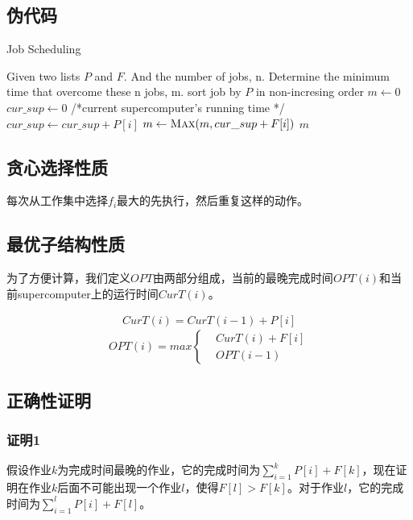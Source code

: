 \documentclass[UTF8,a4paper,12pt]{article}
\begin{document}
\begin{CJK}{UTF8}{gkai}
	\subsection{伪代码}
		\begin{algorithm}[htb]
			\caption{Job Scheduling}
			\begin{algorithmic}[1]
				\Require
					Given two lists $ P $ and $ F $. And the number of jobs, n.
				\Ensure
					Determine the minimum time that overcome these n jobs, m.
					\State sort job by $ P $ in non-incresing order
					\State $ m \gets 0 $
					\State $ cur\_sup \gets 0 $ /*current supercomputer's running time */
						\State $ cur\_sup \gets cur\_sup + P[i] $
						\State $ m \gets \Call{Max}{m,cur\_sup+F[i]} $
					\EndFor
					\State \Return $ m $
				\EndFunction
			\end{algorithmic}
		\end{algorithm}
		
	\subsection{贪心选择性质}
		每次从工作集中选择$ f_{i} $最大的先执行，然后重复这样的动作。
		
	\subsection{最优子结构性质}
		
		为了方便计算，我们定义$ OPT $由两部分组成，当前的最晚完成时间$ OPT(i) $和当前supercomputer上的运行时间$ CurT(i) $。
	
		\begin{align*}
			CurT(i) = CurT(i-1) +P[i]
		\end{align*}
		$$ OPT(i) = max \left\{
			\begin{aligned}
				& CurT(i)+F[i]\\
				& OPT(i-1)
			\end{aligned}
			\right.
		$$

	\subsection{正确性证明}
	\subsubsection{证明1}
		假设作业$ k $为完成时间最晚的作业，它的完成时间为$ \sum_{i=1}^{k}P[i]+F[k] $，现在证明在作业$ k $后面不可能出现一个作业$ l $，使得$ F[l]>F[k] $。对于作业$ l $，它的完成时间为$ \sum_{i=1}^{l}P[i]+F[l] $。
		

\end{CJK}
\end{document}
